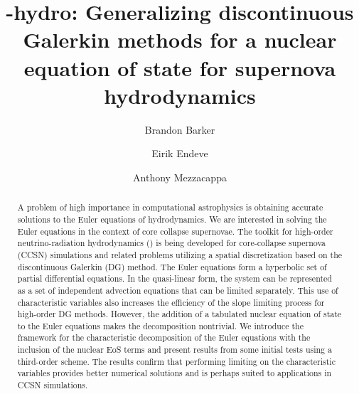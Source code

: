 \documentclass[onecolumn]{aastex62}
\begin{document}
\title{\thornado-hydro: Generalizing discontinuous Galerkin methods for a nuclear
equation of state for supernova hydrodynamics}
\author{Brandon Barker}

\author{Eirik Endeve}

\author{Anthony Mezzacappa}


\begin{abstract}
A problem of high importance in computational astrophysics is obtaining accurate
solutions to the Euler equations of hydrodynamics. We are interested in solving
the Euler equations in the context of core collapse supernovae.
The toolkit for high-order neutrino-radiation hydrodynamics (\thornado)
is being developed for core-collapse supernova (CCSN) simulations and related problems utilizing a spatial discretization
based on the discontinuous Galerkin (DG) method.
The Euler equations form a hyperbolic set of partial differential equations.
In the quasi-linear form, the system can be represented
as a set of independent advection equations that can be limited separately.
This use of characteristic variables also increases the efficiency of the slope
limiting process for high-order DG methods. However, the addition of a
tabulated nuclear equation of state to the Euler equations makes the decomposition nontrivial.
We introduce the framework for the characteristic decomposition of the Euler equations
with the inclusion of the nuclear EoS terms and
present results from some initial tests using a third-order scheme.
The results confirm that performing limiting
on the characteristic variables provides better numerical solutions and is perhaps
suited to applications in CCSN simulations.
\end{abstract}

\end{document}
